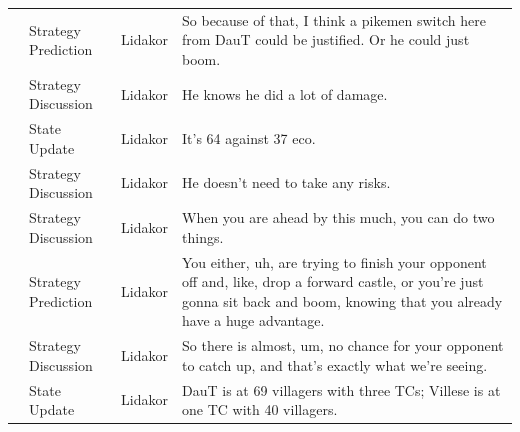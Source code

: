 {\begin{longtable}{@{}>{\theAppRow}r|L{2.3cm}L{1.0cm}U{11.55cm}@{}}
    & Strategy Prediction   & Lidakor & So because of that, I think a pikemen switch here from DauT could be justified. Or he could just boom.                                                                                                                                                                                          \\
    & Strategy Discussion   & Lidakor & He knows he did a lot of damage.                                                                                                                                                                                                                                                                \\
    & State Update          & Lidakor & It's 64 against 37 eco.                                                                                                                                                                                                                                                                         \\
    & Strategy Discussion   & Lidakor & He doesn't need to take any risks.                                                                                                                                                                                                                                                              \\
    & Strategy Discussion   & Lidakor & When you are ahead by this much, you can do two things.                                                                                                                                                                                                                                         \\
    & Strategy Prediction   & Lidakor & You either, uh, are trying to finish your opponent off and, like, drop a forward castle, or you're just gonna sit back and boom, knowing that you already have a huge advantage.                                                                                                                \\
    & Strategy Discussion   & Lidakor & So there is almost, um, no chance for your opponent to catch up, and that's exactly what we're seeing.                                                                                                                                                                                          \\
    & State Update          & Lidakor & DauT is at 69 villagers with three TCs; Villese is at one TC with 40 villagers.                                                                                                                                                                                                                 \\

\end{longtable}}
